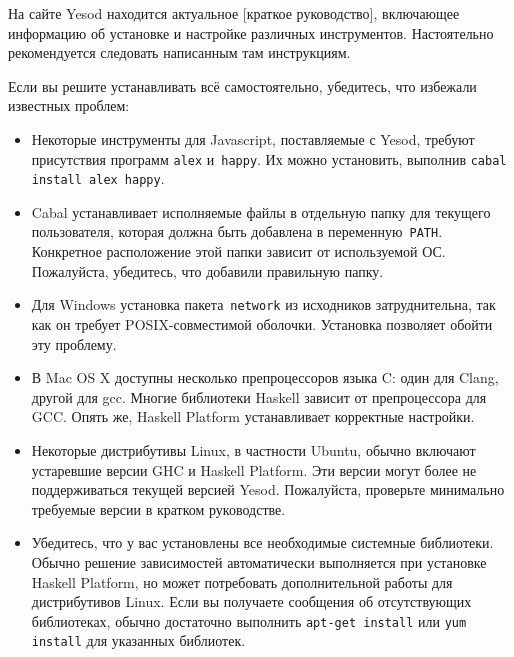 На сайте Yesod находится актуальное
[краткое руководство],
включающее информацию об установке и настройке различных инструментов.
Настоятельно рекомендуется следовать написанным там инструкциям.

Если вы решите устанавливать всё самостоятельно, убедитесь, что избежали
известных проблем:
\begin{itemize}
    \item Некоторые инструменты для Javascript, поставляемые с Yesod, требуют
        присутствия программ \texttt{alex} и~\texttt{happy}. Их можно
        установить, выполнив \texttt{cabal install alex happy}.

    \item Cabal устанавливает исполняемые файлы в отдельную папку для текущего
        пользователя, которая должна быть добавлена в переменную~\texttt{PATH}.
        Конкретное расположение этой папки зависит от используемой ОС.
        Пожалуйста, убедитесь, что добавили
        {правильную папку}.

    \item Для Windows установка пакета~\texttt{network} из исходников
        затруднительна, так как он требует POSIX-совместимой оболочки.
        Установка 
        позволяет обойти эту проблему.

    \item В Mac OS X доступны несколько препроцессоров языка C: один для Clang,
        другой для gcc. Многие библиотеки Haskell зависит от препроцессора для
        GCC. Опять же, Haskell Platform устанавливает корректные настройки.

    \item Некоторые дистрибутивы Linux, в частности Ubuntu, обычно включают
        устаревшие версии GHC и Haskell Platform. Эти версии могут более не
        поддерживаться текущей версией Yesod. Пожалуйста, проверьте минимально
        требуемые версии в кратком руководстве.

    \item Убедитесь, что у вас установлены все необходимые системные
        библиотеки. Обычно решение зависимостей автоматически выполняется при
        установке Haskell Platform, но может потребовать дополнительной работы
        для дистрибутивов Linux. Если вы получаете сообщения об отсутствующих
        библиотеках, обычно достаточно выполнить \texttt{apt-get install} или
        \texttt{yum install} для указанных библиотек.
\end{itemize}

